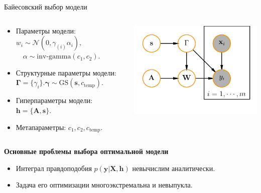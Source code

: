 \documentclass[usenames,dvipsnames,11pt,pdf,utf8,russian,aspectratio=43]{beamer}
\begin{document}
\begin{frame}{Байесовский выбор модели}
\begin{columns}
\begin{column}{0.6\textwidth}
  
\begin{itemize}
\item Параметры модели:\\ ${w}_i \sim \mathcal{N}(0, \gamma_{(i)} \alpha_i),$ \\$\quad \alpha \sim \text{inv-gamma}(c_1, c_2).$  
\item Структурные параметры модели: $\boldsymbol{\Gamma} = \{\gamma_i\}. \boldsymbol{\gamma} \sim \text{GS}(\mathbf{s}, c_\text{temp}).$ 
\item Гиперпараметры модели: $\mathbf{h} = \{\mathbf{A}, \mathbf{s} \}.$
\item Метапараметры: $c_1, c_2, c_\text{temp}$.
\end{itemize}

\end{column}
\begin{column}{0.4\textwidth}  %
    \begin{center}
     \includegraphics[width=\textwidth]{simple_plate_concrete.pdf}
     \end{center}
\end{column}
\end{columns}

\begin{block}{
\textbf{Основные проблемы выбора оптимальной модели}}
\begin{itemize}
\item Интеграл правдоподобия $p(\mathbf{y}|\mathbf{X}, \mathbf{h})$  невычислим аналитически.
\item Задача его оптимизации многоэкстремальна и невыпукла.
\end{itemize}
\end{block}
\end{frame}
\end{document}
